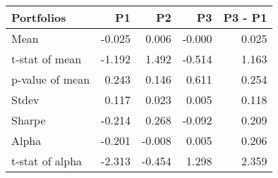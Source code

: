 \begin{tabular}{lrrrr}
\toprule
Portfolios & P1 & P2 & P3 & P3 - P1 \\
\midrule
Mean & -0.025 & 0.006 & -0.000 & 0.025 \\
t-stat of mean & -1.192 & 1.492 & -0.514 & 1.163 \\
p-value of mean & 0.243 & 0.146 & 0.611 & 0.254 \\
Stdev & 0.117 & 0.023 & 0.005 & 0.118 \\
Sharpe & -0.214 & 0.268 & -0.092 & 0.209 \\
Alpha & -0.201 & -0.008 & 0.005 & 0.206 \\
t-stat of alpha & -2.313 & -0.454 & 1.298 & 2.359 \\
\bottomrule
\end{tabular}
